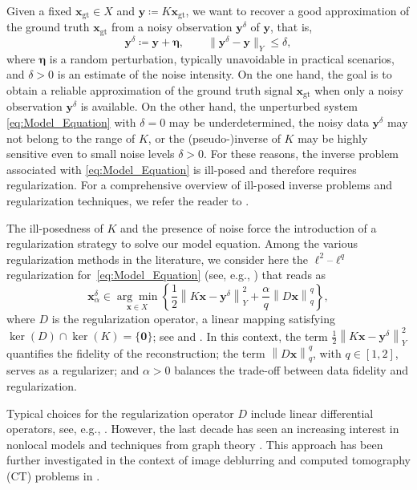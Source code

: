 \documentclass{article}
\theoremstyle{remark}
\newcommand{\gt}{\bm{x}_{\mathrm{gt}}}
\newcommand{\norm}[1]{\left\lVert #1 \right\rVert}
\newcommand{\bx}{{\bm{x}}}
\newcommand{\by}{{\bm{y}}}
\begin{document}
Given a fixed $\gt \in X$ and $\by\coloneqq K\gt$, we want to recover a good approximation of the ground truth $\gt$ from a noisy observation $\by^\delta$ of $\by$, that is,
\begin{equation*}
	\by^\delta \coloneqq \by + \bm{\eta}, \qquad \|\by^\delta - \by\|_Y\leq \delta,
\end{equation*}
where $\bm{\eta}$ is a random perturbation, typically unavoidable in practical scenarios, and $\delta>0$ is an estimate of the noise intensity.
On the one hand, the goal is to obtain a reliable approximation of the ground truth signal $\gt$ when only a noisy observation $\by^\delta$ is available. On the other hand, the unperturbed system \cref{eq:Model_Equation} with $\delta = 0$ may be underdetermined, the noisy data $\by^\delta$ may not belong to the range of $K$, or the (pseudo-)inverse of $K$ may be highly sensitive even to small noise levels $\delta > 0$. For these reasons, the inverse problem associated with \cref{eq:Model_Equation} is ill-posed and therefore requires regularization. For a comprehensive overview of ill-posed inverse problems and regularization techniques, we refer the reader to
\cite{engl1996regularization,hansen1998rank,scherzer2009variational}.

The ill-posedness of $K$ and the presence of noise force the introduction of a regularization strategy to solve our model equation. Among the various regularization methods in the literature, we consider here the $\ell^2$--$\ell^q$ regularization for~\cref{eq:Model_Equation} (see, e.g., \cite{CH14,LMRS15,HLMRS17}) that reads as
\begin{equation}\label{model_eq2}
	\bx^\delta_\alpha \in	\underset{\bx \in X}{\arg\min} \left\{ \frac{1}{2}\norm{K\bx - \by^\delta}_Y^2 + \frac{\alpha}{q}\norm{D \bx}_q^q \right\},
\end{equation} 
where $D$ is the regularization operator, a linear mapping satisfying $\ker(D)\cap\ker(K)=\{\boldsymbol{0}\}$; see \cite[Chapter 8]{engl1996regularization} and \cite{morozov2012methods}. In this context, the term $\frac{1}{2}\norm{K\bx-\by^\delta}_Y^2$ quantifies the fidelity of the reconstruction; the term $\norm{D\bx}_q^q$, with $q\in[1,2]$, serves as a regularizer; and $\alpha>0$ balances the trade-off between data fidelity and regularization.

Typical choices for the regularization operator $D$ include linear differential operators, see, e.g., \cite{ROF92,hansen2006deblurring,DR14}.
However, the last decade has seen an increasing interest in nonlocal models and techniques from graph theory \cite{gilboa2007nonlocal,gilboa2009nonlocal,Peyre2008nonlocal,arias2009variational}. This approach has been further investigated in the context of image deblurring and computed tomography (CT) problems in \cite{bianchi2021graph_approximation,buccini2021graph,bianchi2021graph,lou2010image,zhang2010bregmanized}.
\end{document}
